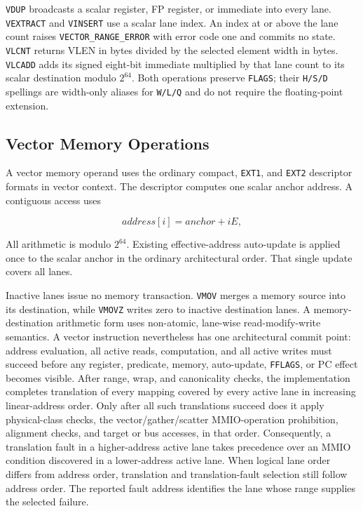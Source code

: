 \texttt{VDUP} broadcasts a scalar register, FP register, or immediate into
every lane.  \texttt{VEXTRACT} and \texttt{VINSERT} use a scalar lane index.  An
index at or above the lane count raises \texttt{VECTOR\_RANGE\_ERROR} with
error code one and commits no state.  \texttt{VLCNT} returns VLEN in bytes
divided by the selected element width in bytes.  \texttt{VLCADD} adds its
signed eight-bit immediate multiplied by that lane count to its scalar
destination modulo $2^{64}$.  Both operations preserve \texttt{FLAGS}; their
\texttt{H/S/D} spellings are width-only aliases for \texttt{W/L/Q} and do not
require the floating-point extension.

\subsection{Vector Memory Operations}

A vector memory operand uses the ordinary compact, \texttt{EXT1}, and
\texttt{EXT2} descriptor formats in vector context.  The descriptor computes
one scalar anchor address.  A contiguous access uses

\[
  address[i] = anchor + iE,
\]

All arithmetic is modulo $2^{64}$. Existing effective-address auto-update is
applied once to the scalar anchor in the ordinary architectural order. That
single update covers all lanes.

Inactive lanes issue no memory transaction.  \texttt{VMOV} merges a memory
source into its destination, while \texttt{VMOVZ} writes zero to inactive
destination lanes. A memory-destination arithmetic form uses non-atomic,
lane-wise read-modify-write semantics. A vector instruction nevertheless
has one architectural commit point: address evaluation, all active reads,
computation, and all active writes must succeed before any register,
predicate, memory, auto-update, \texttt{FFLAGS}, or PC effect becomes visible.
After range, wrap, and canonicality checks, the implementation completes
translation of every mapping covered by every active lane in increasing
linear-address order.  Only after all such translations succeed does it apply
physical-class checks, the vector/gather/scatter MMIO-operation prohibition,
alignment checks, and target or bus accesses, in that order.  Consequently, a
translation fault in a higher-address active lane takes precedence over an
MMIO condition discovered in a lower-address active lane.  When logical lane
order differs from address order, translation and translation-fault selection
still follow address order.  The reported fault address identifies the lane
whose range supplies the selected failure.

